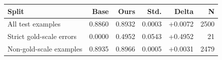 \begin{tabular}{lrrrrr}
\toprule
Split & Base & Ours & Std. & Delta & N \\
\midrule
All test examples & 0.8860 & 0.8932 & 0.0003 & +0.0072 & 2500 \\
Strict gold-scale errors & 0.0000 & 0.4952 & 0.0543 & +0.4952 & 21 \\
Non-gold-scale examples & 0.8935 & 0.8966 & 0.0005 & +0.0031 & 2479 \\
\bottomrule
\end{tabular}
